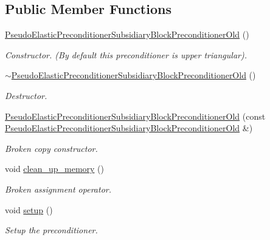 \subsection*{Public Member Functions}
\begin{DoxyCompactItemize}
\item 
\hyperlink{classoomph_1_1PseudoElasticPreconditionerSubsidiaryBlockPreconditionerOld_a270a6c5fc522dc82196e89bc6ece086d}{Pseudo\+Elastic\+Preconditioner\+Subsidiary\+Block\+Preconditioner\+Old} ()
\begin{DoxyCompactList}\small\item\em Constructor. (By default this preconditioner is upper triangular). \end{DoxyCompactList}\item 
\hyperlink{classoomph_1_1PseudoElasticPreconditionerSubsidiaryBlockPreconditionerOld_a3d44a67738fba34197376f1a1865bfe1}{$\sim$\+Pseudo\+Elastic\+Preconditioner\+Subsidiary\+Block\+Preconditioner\+Old} ()
\begin{DoxyCompactList}\small\item\em Destructor. \end{DoxyCompactList}\item 
\hyperlink{classoomph_1_1PseudoElasticPreconditionerSubsidiaryBlockPreconditionerOld_a0404c3dde274de59918d3e2e7edd2de2}{Pseudo\+Elastic\+Preconditioner\+Subsidiary\+Block\+Preconditioner\+Old} (const \hyperlink{classoomph_1_1PseudoElasticPreconditionerSubsidiaryBlockPreconditionerOld}{Pseudo\+Elastic\+Preconditioner\+Subsidiary\+Block\+Preconditioner\+Old} \&)
\begin{DoxyCompactList}\small\item\em Broken copy constructor. \end{DoxyCompactList}\item 
void \hyperlink{classoomph_1_1PseudoElasticPreconditionerSubsidiaryBlockPreconditionerOld_a8bb2215735df1a583b4bc1b92bded1e6}{clean\+\_\+up\+\_\+memory} ()
\begin{DoxyCompactList}\small\item\em Broken assignment operator. \end{DoxyCompactList}\item 
void \hyperlink{classoomph_1_1PseudoElasticPreconditionerSubsidiaryBlockPreconditionerOld_a4477e968641690ab5c66c8155aef8a99}{setup} ()
\begin{DoxyCompactList}\small\item\em Setup the preconditioner. \end{DoxyCompactList}\item 

\end{DoxyCompactItemize}

